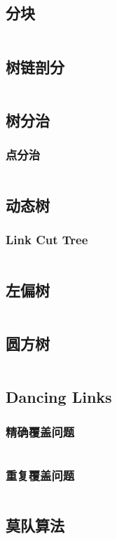 \documentclass[a4paper,10pt]{article}
\begin{document}
\subsection{分块}
\inputminted[breaklines, linenos]{c++}{ds/decompose.cc}
\subsection{树链剖分}
\inputminted[breaklines, linenos]{c++}{ds/hld.cc}
\subsection{树分治}
\subsubsection{点分治}
\inputminted[breaklines, linenos]{c++}{ds/tree_divide.cc}
\subsection{动态树}
\subsubsection{Link Cut Tree}
\inputminted[breaklines, linenos]{c++}{ds/lct.cc}
\subsection{左偏树}
\inputminted[breaklines, linenos]{c++}{ds/leftist.cc}
\subsection{圆方树}
\inputminted[breaklines, linenos]{c++}{ds/cactus.cc}
\subsection{Dancing Links}
\subsubsection{精确覆盖问题}
\inputminted[breaklines, linenos]{c++}{ds/exact_cover.cc}
\subsubsection{重复覆盖问题}
\inputminted[breaklines, linenos]{c++}{ds/multi_cover.cc}
\subsection{莫队算法}
\end{document}
